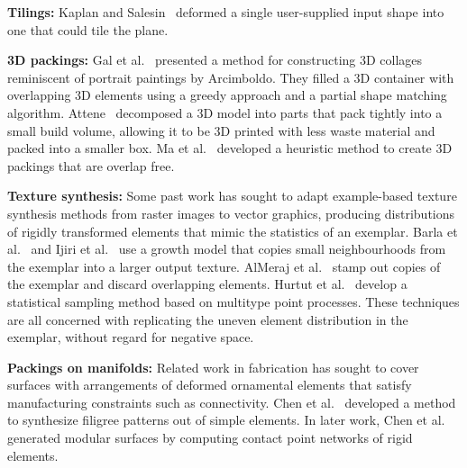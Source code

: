 \textbf{Tilings:}
Kaplan and Salesin~\cite{Kaplan2000} deformed a single user-supplied 
input shape into one that could tile the plane.

\textbf{3D packings:}
Gal et al.~\cite{Gal2007B} presented a method for constructing 3D
collages reminiscent of portrait paintings by Arcimboldo.  They
filled a 3D container with overlapping 3D elements using a greedy
approach and a partial shape matching algorithm.
Attene~\cite{Attene2015} decomposed a 3D model into parts that pack
tightly into a small build volume, allowing it to 
be 3D printed with less waste material and packed into a smaller box.
Ma et al.~\cite{Ma2018} developed a heuristic method
to create 3D packings that are overlap free.

\textbf{Texture synthesis:}
Some past work has sought to adapt example-based texture synthesis methods
from raster images to vector graphics, producing distributions of rigidly transformed elements
that mimic the statistics of an exemplar.  Barla et al.~\cite{Barla2006} and
Ijiri et al.~\cite{Ijiri2008} use a growth model that copies small neighbourhoods
from the exemplar into a larger output texture.  AlMeraj et al.~\cite{AlMeraj2013}
stamp out copies of the exemplar and discard overlapping elements.
Hurtut et al.~\cite{Hurtut2009} develop a statistical sampling method based
on multitype point processes.  
These techniques are all concerned with replicating
the uneven element distribution in the exemplar, without regard for negative space.

\textbf{Packings on manifolds:}
Related work in fabrication has sought to cover surfaces with
arrangements of deformed ornamental elements that satisfy manufacturing
constraints such as connectivity.  Chen et al.~\cite{Chen2016}
developed a method to synthesize filigree patterns out of simple
elements. 
In later work, Chen et al.~\cite{Chen2017}
generated modular surfaces by computing 
contact point networks of rigid elements.




